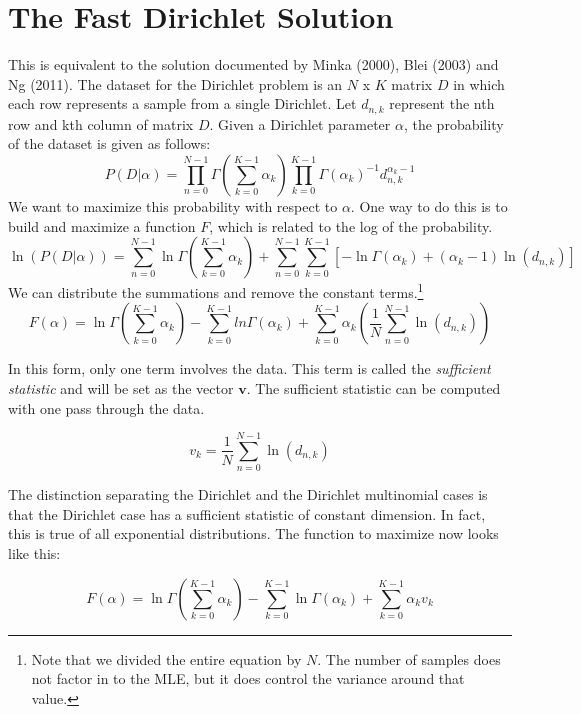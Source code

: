 \documentclass[twoside]{article}
\begin{document}
\section{The Fast Dirichlet Solution}
\label{fastdirichlet}

This is equivalent to the solution documented by Minka\cite{minka} (2000), Blei\cite[A.4.2]{blei} (2003) and Ng\cite[pg 72-73]{ng} (2011).  The dataset for the Dirichlet problem is an \(N\) x \(K\) matrix $D$ in which each row represents a sample from a single Dirichlet.  Let $d_{n,k}$ represent the nth row and kth column of matrix $D$.  Given a Dirichlet parameter $\alpha$, the probability of the dataset is given as follows:
\[
P(D|\alpha)=\prod_{n=0}^{N-1}\Gamma\left(\sum_{k=0}^{K-1}\alpha_k\right)\prod_{k=0}^{K-1}\Gamma(\alpha_k)^{-1}d_{n,k}^{\alpha_k-1}
\]
We want to maximize this probability with respect to $\alpha$.  One way to do this is to build and maximize a function $F$, which is related to the log of the probability.
\begin{equation}
\ln(P(D|\alpha))=\sum_{n=0}^{N-1}\ln\Gamma\left(\sum_{k=0}^{K-1}\alpha_k\right) + \sum_{n=0}^{N-1}\sum_{k=0}^{K-1}\left[-\ln\Gamma(\alpha_k) + (\alpha_k-1)\ln\left(d_{n,k}\right)\right]
\end{equation}
We can distribute the summations and remove the constant terms.\footnote{Note that we divided the entire equation by $N$.  The number of samples does not factor in to the MLE, but it does control the variance around that value.}
\begin{equation} \label{eq:dirichf}
F(\alpha)=\ln\Gamma\left(\sum_{k=0}^{K-1}\alpha_k\right) - \sum_{k=0}^{K-1}ln\Gamma(\alpha_k) + \sum_{k=0}^{K-1}\alpha_k\left(\frac{1}{N}\sum_{n=0}^{N-1}\ln\left(d_{n,k}\right)\right)
\end{equation}

In this form, only one term involves the data. This term is called the \textit{sufficient statistic} and will be set as the vector $\mathbf{v}$. The sufficient statistic can be computed with one pass through the data.

\[v_k=\frac{1}{N}\sum_{n=0}^{N-1}\ln\left(d_{n,k}\right)\]

The distinction separating the Dirichlet and the Dirichlet multinomial cases is that the Dirichlet case has a sufficient statistic of constant dimension.  In fact, this is true of all exponential distributions\cite[pg 116]{robert}.  The function to maximize now looks like this:

\[
F(\alpha)=\ln\Gamma(\sum_{k=0}^{K-1}\alpha_k)-\sum_{k=0}^{K-1}\ln\Gamma(\alpha_k)+\sum_{k=0}^{K-1}\alpha_kv_k
\]
\end{document}
